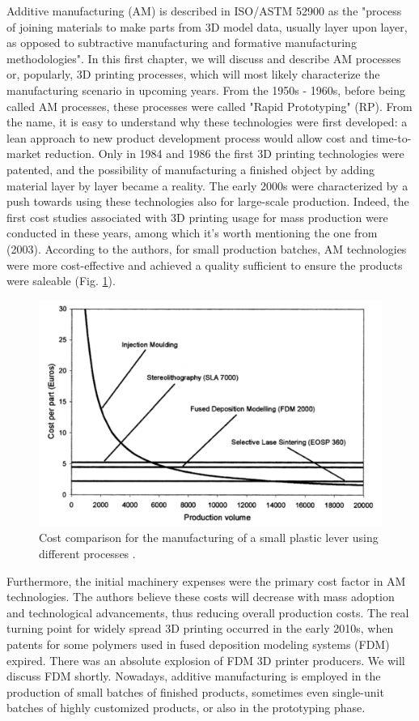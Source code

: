 Additive manufacturing (AM) is described in ISO/ASTM 52900 \cite{organization_isoastm_2015} as the "process of joining materials to make parts from 3D model data, usually layer upon layer, as opposed to subtractive manufacturing and formative manufacturing methodologies".
In this first chapter, we will discuss and describe AM processes or, popularly, 3D printing processes, which will most likely characterize the manufacturing scenario in upcoming years. From the 1950s - 1960s, before being called AM processes, these processes were called "Rapid Prototyping" (RP). From the name, it is easy to understand why these technologies were first developed: a lean approach to new product development process would allow cost and time-to-market reduction. Only in 1984 and 1986 the first 3D printing technologies were patented, and the possibility of manufacturing a finished object by adding material layer by layer became a reality. The early 2000s were characterized by a push towards using these technologies also for large-scale production. Indeed, the first cost studies associated with 3D printing usage for mass production were conducted in these years, among which it's worth mentioning the one from \citeauthor{hopkinson_analysis_2003} (2003). According to the authors, for small production batches, AM technologies were more cost-effective and achieved a quality sufficient to ensure the products were saleable (Fig. \ref{fig:costs}).
\begin{figure}[H]
    \centering
    \includegraphics[width=0.55 \textwidth]{Images/costs.png}
    \caption[Traditional processes vs AM costs.]{Cost comparison for the manufacturing of a small plastic lever using different processes \cite{hopkinson_analysis_2003}.}
    \label{fig:costs}
\end{figure}
Furthermore, the initial machinery expenses were the primary cost factor in AM technologies. The authors believe these costs will decrease with mass adoption and technological advancements, thus reducing overall production costs. The real turning point for widely spread 3D printing occurred in the early 2010s, when patents for some polymers used in fused deposition modeling systems (FDM) expired. There was an absolute explosion of FDM 3D printer producers. We will discuss FDM shortly. Nowadays, additive manufacturing is employed in the production of small batches of finished products, sometimes even single-unit batches of highly customized products, or also in the prototyping phase.

